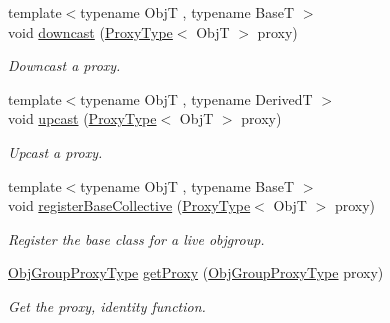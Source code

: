 \begin{DoxyCompactItemize}
{\footnotesize template$<$typename ObjT , typename BaseT $>$ }\\void \hyperlink{structvt_1_1objgroup_1_1_obj_group_manager_ab7ea99ad2668a99debd687a20bb9e3dd}{downcast} (\hyperlink{structvt_1_1objgroup_1_1_obj_group_manager_aea65eef52f240a52210132eef5ce591f}{Proxy\+Type}$<$ ObjT $>$ proxy)
\begin{DoxyCompactList}\small\item\em Downcast a proxy. \end{DoxyCompactList}\item 
{\footnotesize template$<$typename ObjT , typename DerivedT $>$ }\\void \hyperlink{structvt_1_1objgroup_1_1_obj_group_manager_abddd0f80c5b0f625a4ed487414c3b39b}{upcast} (\hyperlink{structvt_1_1objgroup_1_1_obj_group_manager_aea65eef52f240a52210132eef5ce591f}{Proxy\+Type}$<$ ObjT $>$ proxy)
\begin{DoxyCompactList}\small\item\em Upcast a proxy. \end{DoxyCompactList}\item 
{\footnotesize template$<$typename ObjT , typename BaseT $>$ }\\void \hyperlink{structvt_1_1objgroup_1_1_obj_group_manager_a6e869a6e38c7fe4e176814ca93ecf36e}{register\+Base\+Collective} (\hyperlink{structvt_1_1objgroup_1_1_obj_group_manager_aea65eef52f240a52210132eef5ce591f}{Proxy\+Type}$<$ ObjT $>$ proxy)
\begin{DoxyCompactList}\small\item\em Register the base class for a live objgroup. \end{DoxyCompactList}\item 
\hyperlink{namespacevt_ad7cae989df485fccca57f0792a880a8e}{Obj\+Group\+Proxy\+Type} \hyperlink{structvt_1_1objgroup_1_1_obj_group_manager_a9569c5ad1c032a90573bd987c64f560a}{get\+Proxy} (\hyperlink{namespacevt_ad7cae989df485fccca57f0792a880a8e}{Obj\+Group\+Proxy\+Type} proxy)
\begin{DoxyCompactList}\small\item\em Get the proxy, identity function. \end{DoxyCompactList}\end{DoxyCompactItemize}
